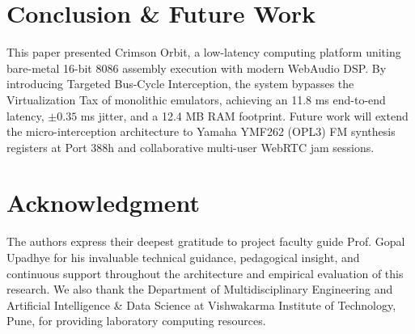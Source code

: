 \documentclass[conference]{IEEEtran}
\begin{document}
\section{Conclusion \& Future Work}
This paper presented Crimson Orbit, a low-latency computing platform uniting bare-metal 16-bit 8086 assembly execution with modern WebAudio DSP. By introducing Targeted Bus-Cycle Interception, the system bypasses the Virtualization Tax of monolithic emulators, achieving an 11.8 ms end-to-end latency, $\pm 0.35$ ms jitter, and a 12.4 MB RAM footprint. Future work will extend the micro-interception architecture to Yamaha YMF262 (OPL3) FM synthesis registers at Port 388h and collaborative multi-user WebRTC jam sessions.

\section*{Acknowledgment}
The authors express their deepest gratitude to project faculty guide Prof. Gopal Upadhye for his invaluable technical guidance, pedagogical insight, and continuous support throughout the architecture and empirical evaluation of this research. We also thank the Department of Multidisciplinary Engineering and Artificial Intelligence \& Data Science at Vishwakarma Institute of Technology, Pune, for providing laboratory computing resources.
\end{document}
